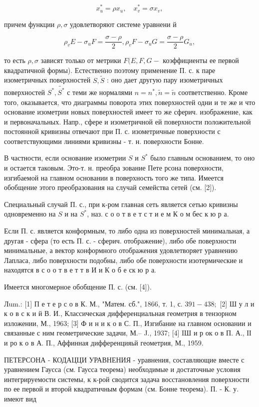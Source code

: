 \documentclass[10pt]{article}
\begin{document}
\[
x_{u}^{*}=\rho x_{u}, \quad x_{v}^{*}=\sigma x_{v},
\]

причем функции $\rho, \sigma$ удовлетворяют системе уравнени й

\[
\rho_{v} E-\sigma_{u} F=\frac{\sigma-\rho}{2}, \rho_{v} F-\sigma_{u} G=\frac{\sigma-\rho}{2} G_{u},
\]

то есть $\rho, \sigma$ зависят только от метрики $F(E, F, G-$ коэффициенты ее первой квадратичной формы). Естественно поэтому применение П. с. к паре изометричных поверхностей $S, \tilde{S}$ : оно дает другую пару изометричных поверхностей $S^{*}, \tilde{S^{*}}$ с теми же нормалями $n=n^{*}, \tilde{n}=\tilde{n}$ соответственно. Кроме того, оказывается, что диаграммы поворота этих поверхностей одни и те же и что основание изометрии новых поверхностей имеет то же сферич. изображение, как и первоначальных. Напр., сфере и изометричной ей поверхности положительной постоянной кривизны отвечают при П. с. изометричные поверхности с соответствующими линиями кривизны - т. н. поверхности Бонне.

В частности, если основание изометрии $S$ и $S^{*}$ было главным основанием, то оно и остается таковым. Это-т. н. преобра зование Пете рсона поверхности, изгибаемой на главном основании в поверхность того же типа. Имеется обобщение этого преобразования на случай семейства сетей (см. [2]).

Специальный случай П. с., при к-ром главная сеть является сетью кривизны одновременно на $S$ и на $S^{*}$, наз. с о о т в е т с т и е м $К$ о м бес к ю р а.

Если П. с. является конформным, то либо одна из поверхностей минимальная, а другая - сфера (то есть П. с. - сферич. отображение), либо обе поверхности минимальные, а вектор конформного отображения удовлетворяет уравнению Лапласа, либо поверхности подобны, либо обе поверхности изотермические и находятся в с о о т в е т т в И и К о б е ск ю р а.

Имеется многомерное обобщение П. с. (см. [4]).

Лum.: [1] П е т е р с о в К. М., "Матем. сб.", 1866, т. 1, с.
$391-438 ;$ [2] Ш у л и к о в с к и й В. И., Классическая дифференциальная геометрия в тензорном изложении, М., 1963; [3] Ф и н и к о в С. П., Изгибание на главном основании и связанные с ним геометрические задачи, М.-- J., 1937; [4] IШ и р ок о в П. А., ІІ и ро к о в А. П., Аффинная дифференцияьй
геометрия, М., 1959.

ПЕТЕРСОНА - КОДАЦЦИ УРАВНЕНИЯ - уравнения, составляющие вместе с уравнением Гаусса (см. Гаусса теорема) необходимые и достаточные условия интегрируемости системы, к к-рой сводится задача восстановления поверхности по ее первой и второй квадратичным формам (см. Бонне теорема). П. - К. у. имеют вид
\end{document}
